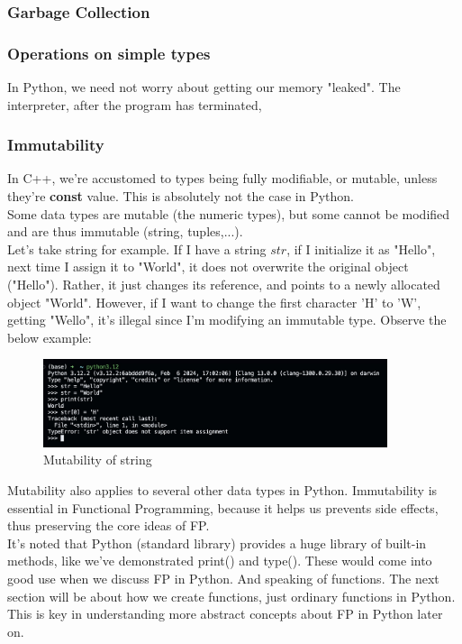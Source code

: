 \documentclass[twoside,final]{hcmut-report}
\begin{document}
\subsubsection{Garbage Collection}

\subsubsection{Operations on simple types}
\hspace*{1mm} In Python, we need not worry about getting our memory "leaked". The interpreter, after the program has terminated, 
\subsubsection{Immutability}
\hspace*{1mm} In C++, we're accustomed to types being fully modifiable, or mutable, unless they're \textbf{const} value. This is absolutely not the case in Python. \\
\hspace*{6.5mm} Some data types are mutable (the numeric types), but some cannot be modified and are thus immutable (string, tuples,...). \\
\hspace*{6.5mm} Let's take string for example. If I have a string $str$, if I initialize it as "Hello", next time I assign it to "World", it does not overwrite the original object ("Hello"). Rather, it just changes its reference, and points to a newly allocated object "World". However, if I want to change the first character 'H' to 'W', getting "Wello", it's illegal since I'm modifying an immutable type. Observe the below example:\\
\begin{figure}[ht]
\centering
\includegraphics[width=0.9\textwidth]{graphics/python4}
\caption{Mutability of string}
\end{figure}
\hspace*{6.5mm} Mutability also applies to several other data types in Python. Immutability is essential in Functional Programming, because it helps us prevents side effects, thus preserving the core ideas of FP.\\
\hspace*{6.5mm} It's noted that Python (standard library) provides a huge library of built-in methods, like we've demonstrated print() and type(). These would come into good use when we discuss FP in Python. And speaking of functions. The next section will be about how we create functions, just ordinary functions in Python. This is key in understanding more abstract concepts about FP in Python later on.
\end{document}

